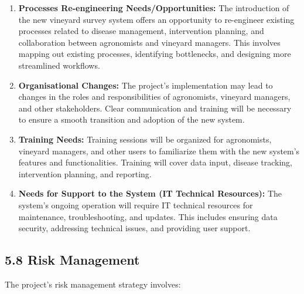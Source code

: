 \begin{enumerate}
    \item \textbf{Processes Re-engineering Needs/Opportunities:} The introduction of the new vineyard survey system offers an opportunity to re-engineer existing processes related to disease management, intervention planning, and collaboration between agronomists and vineyard managers. This involves mapping out existing processes, identifying bottlenecks, and designing more streamlined workflows.

    \item \textbf{Organisational Changes:} The project's implementation may lead to changes in the roles and responsibilities of agronomists, vineyard managers, and other stakeholders. Clear communication and training will be necessary to ensure a smooth transition and adoption of the new system.

    \item \textbf{Training Needs:} Training sessions will be organized for agronomists, vineyard managers, and other users to familiarize them with the new system's features and functionalities. Training will cover data input, disease tracking, intervention planning, and reporting.

    \item \textbf{Needs for Support to the System (IT Technical Resources):} The system's ongoing operation will require IT technical resources for maintenance, troubleshooting, and updates. This includes ensuring data security, addressing technical issues, and providing user support.
\end{enumerate}

\subsection{5.8 Risk Management}

The project's risk management strategy involves:


